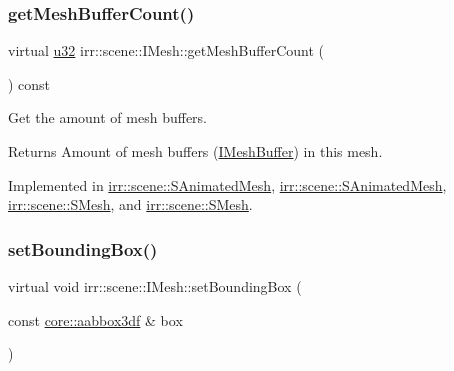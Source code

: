 \subsubsection{\texorpdfstring{get\+Mesh\+Buffer\+Count()}{getMeshBufferCount()}\hspace{0.1cm}{\footnotesize\ttfamily [2/2]}}
{\footnotesize\ttfamily virtual \hyperlink{namespaceirr_a0416a53257075833e7002efd0a18e804}{u32} irr\+::scene\+::\+I\+Mesh\+::get\+Mesh\+Buffer\+Count (\begin{DoxyParamCaption}{ }\end{DoxyParamCaption}) const\hspace{0.3cm}{\ttfamily [pure virtual]}}



Get the amount of mesh buffers. 

\begin{DoxyReturn}{Returns}
Amount of mesh buffers (\hyperlink{classirr_1_1scene_1_1IMeshBuffer}{I\+Mesh\+Buffer}) in this mesh. 
\end{DoxyReturn}


Implemented in \hyperlink{structirr_1_1scene_1_1SAnimatedMesh_a01dd8fd3ea4a53af90599697cd34ea01}{irr\+::scene\+::\+S\+Animated\+Mesh}, \hyperlink{structirr_1_1scene_1_1SAnimatedMesh_a01dd8fd3ea4a53af90599697cd34ea01}{irr\+::scene\+::\+S\+Animated\+Mesh}, \hyperlink{structirr_1_1scene_1_1SMesh_a08f677a62f8e3770af70293c8043fff4}{irr\+::scene\+::\+S\+Mesh}, and \hyperlink{structirr_1_1scene_1_1SMesh_a08f677a62f8e3770af70293c8043fff4}{irr\+::scene\+::\+S\+Mesh}.

\mbox{\label{classirr_1_1scene_1_1IMesh_a0aee3b5bc5d31ce996becc069f65e642}} 
\subsubsection{\texorpdfstring{set\+Bounding\+Box()}{setBoundingBox()}\hspace{0.1cm}{\footnotesize\ttfamily [1/2]}}
{\footnotesize\ttfamily virtual void irr\+::scene\+::\+I\+Mesh\+::set\+Bounding\+Box (\begin{DoxyParamCaption}\item[{const \hyperlink{namespaceirr_1_1core_a60f4b4c744aba55f10530d503c6ecb04}{core\+::aabbox3df} \&}]{box }\end{DoxyParamCaption})\hspace{0.3cm}{\ttfamily [pure virtual]}}



